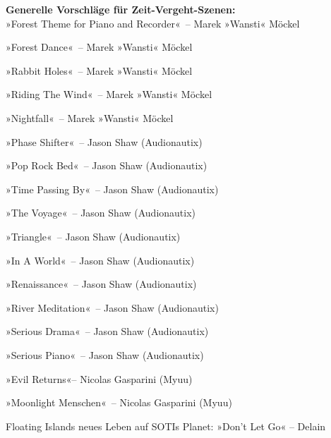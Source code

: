     \item \textbf{Generelle Vorschläge für Zeit-Vergeht-Szenen:}\\ »Forest Theme for Piano and Recorder«~– Marek »Wansti« Möckel
    \item »Forest Dance«~– Marek »Wansti« Möckel
    \item »Rabbit Holes«~– Marek »Wansti« Möckel
    \item »Riding The Wind«~– Marek »Wansti« Möckel
    \item »Nightfall«~– Marek »Wansti« Möckel
    \item »Phase Shifter«~– Jason Shaw (Audionautix)
    \item »Pop Rock Bed«~– Jason Shaw (Audionautix)
    \item »Time Passing By«~– Jason Shaw (Audionautix)
    \item »The Voyage«~– Jason Shaw (Audionautix)
    \item »Triangle«~– Jason Shaw (Audionautix)
    \item »In A World«~– Jason Shaw (Audionautix)
    \item »Renaissance«~– Jason Shaw (Audionautix)
    \item »River Meditation«~– Jason Shaw (Audionautix)
    \item »Serious Drama«~– Jason Shaw (Audionautix)
    \item »Serious Piano«~– Jason Shaw (Audionautix)
    \item »Evil Returns«– Nicolas Gasparini (Myuu)
    \item »Moonlight Menschen«~– Nicolas Gasparini (Myuu)


    Floating Islands neues Leben auf SOTIs Planet: »Don’t Let Go« – Delain


